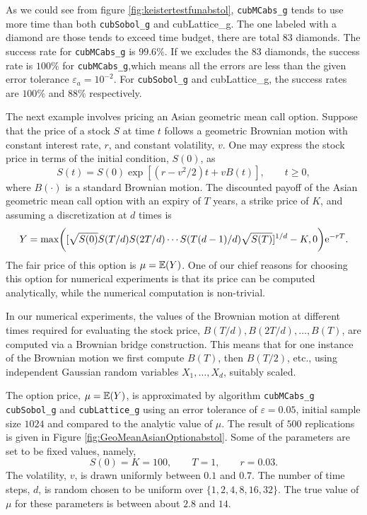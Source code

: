 \documentclass{iitthesis}
\begin{document}
As we could see from figure \ref{fig:keistertestfunabstol}, {\tt cubMCabs\_g} tends to use more time than both {\tt cubSobol\_g} and {cubLattice\_g}. The one labeled with a diamond are those tends to exceed time budget, there are total 83 diamonds. The success rate for {\tt cubMCabs\_g} is $99.6\%$. If we excludes the 83 diamonds, the success rate is $100\%$ for {\tt cubMCabs\_g},which means all the errors are less than the given error tolerance $\varepsilon_a = 10^{-2}$. For {\tt cubSobol\_g} and {cubLattice\_g}, the success rates are $100\%$ and $88\%$ respectively.


The next example involves pricing an Asian geometric mean call option.  Suppose that the price of a stock $S$ at time $t$ follows a geometric Brownian motion with constant interest rate, $r$, and constant volatility, $v$.  
One may express the stock price in terms of the initial condition, $S(0)$, as 
\[
S(t)=S(0) \exp[(r-v^2/2)t + v B(t)], \qquad t \ge 0,
\]
where $B(\cdot)$ is a standard Brownian motion.  
The discounted payoff of the Asian geometric mean call option with an expiry of $T$ years, a strike price of $K$, and assuming a discretization at $d$ times is 
\begin{equation} \label{payoff}
Y=\max\biggl([\sqrt{S(0)}S(T/d) S(2T/d)\cdots S(T(d-1)/d) \sqrt{S(T)}]^{1/d} - K,0 \biggr)\mathrm{e}^{-rT}.
\end{equation}
The fair price of this option is $\mu=\mathbb{E}(Y)$. One of our chief reasons for choosing this option for numerical experiments is that its price can be computed analytically, while the numerical computation is non-trivial.

In our numerical experiments, the values of the Brownian motion at different times required for evaluating the stock price, $B(T/d), B(2T/d), \ldots,  B(T)$, are computed via a Brownian bridge construction.  This means that for one instance of the Brownian motion we first compute $B(T)$, then $B(T/2)$, etc., using independent Gaussian random variables $X_1, \ldots, X_d$, suitably scaled. 


The option price, $\mu=\mathbb{E}(Y)$, is approximated by algorithm {\tt cubMCabs\_g} {\tt cubSobol\_g} and {\tt cubLattice\_g} using an error tolerance of $\varepsilon=0.05$, initial sample size $1024$ and compared to the analytic value of $\mu$.  The result of $500$ replications is given in Figure \ref{fig:GeoMeanAsianOptionabstol}.  Some of the parameters are set to be fixed values, namely,
\[
S(0)=K=100, \qquad T=1, \qquad r=0.03.
\]
The volatility, $v$, is drawn uniformly between $0.1$ and $0.7$.  The number of time steps, $d$, is random chosen to be uniform over $\{1, 2, 4, 8, 16, 32\}$.  The true value of $\mu$ for these parameters is between about $2.8$ and $14$.
\end{document}

